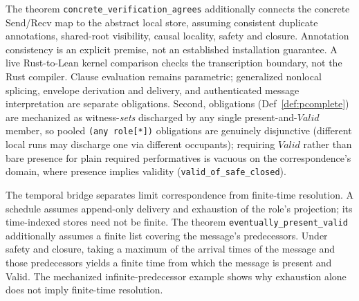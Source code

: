 \documentclass[11pt]{article}
\newcommand{\code}[1]{\texttt{#1}}
\theoremstyle{definition}
\theoremstyle{plain}
\begin{document}
The theorem \code{concrete\_verification\_agrees} additionally connects the
concrete Send/Recv map to the abstract local store, assuming consistent duplicate
annotations, shared-root visibility, causal locality, safety and closure. Annotation
consistency is an explicit premise, not an established installation guarantee.
A live Rust-to-Lean kernel comparison checks the transcription boundary, not the
Rust compiler. Clause evaluation remains parametric; generalized nonlocal splicing,
envelope derivation and delivery, and authenticated message interpretation are separate
obligations.
Second, obligations (Def~\ref{def:pcomplete}) are mechanized as witness-\emph{sets}
discharged by any single present-and-$\mathit{Valid}$ member, so pooled
\code{(any role[*])} obligations are genuinely disjunctive (different local runs may
discharge one via different occupants); requiring $\mathit{Valid}$ rather than bare
presence for plain required performatives is vacuous on the correspondence's domain,
where presence implies validity (\code{valid\_of\_safe\_closed}).

The temporal bridge separates limit correspondence from finite-time resolution.
A schedule assumes append-only delivery and exhaustion of the role's projection;
its time-indexed stores need not be finite. The theorem
\code{eventually\_present\_valid} additionally assumes a finite list covering the
message's predecessors. Under safety and closure, taking a maximum of the arrival
times of the message and those predecessors yields a finite time from which the
message is present and Valid. The mechanized infinite-predecessor example shows why
exhaustion alone does not imply finite-time resolution.
\end{document}
